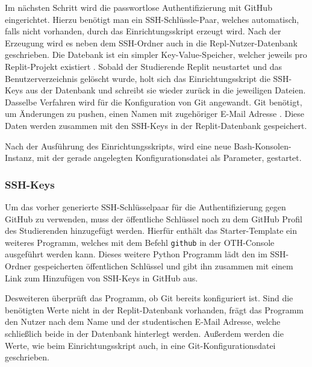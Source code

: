 Im nächsten Schritt wird die passwortlose Authentifizierung mit GitHub
eingerichtet. Hierzu benötigt man ein SSH-Schlüssle-Paar, welches automatisch,
falls nicht vorhanden, durch das Einrichtungsskript erzeugt wird. Nach der
Erzeugung wird es neben dem SSH-Ordner auch in die Repl-Nutzer-Datenbank
geschrieben. Die Datebank ist ein simpler Key-Value-Speicher, welcher jeweils
pro Replit-Projekt existiert \cite{replit-database}. Sobald der Studierende
Replit neustartet und das Benutzerverzeichnis gelöscht wurde, holt sich das Einrichtungsskript die SSH-Keys aus der Datenbank und schreibt sie wieder
zurück in die jeweiligen Dateien. Dasselbe Verfahren wird für die Konfiguration
von Git angewandt. Git benötigt, um Änderungen zu pushen, einen Namen mit
zugehöriger E-Mail Adresse \cite{git-config}. Diese Daten werden zusammen mit
den SSH-Keys in der Replit-Datenbank gespeichert.

Nach der Ausführung des Einrichtungsskripts, wird eine neue
Bash-Konsolen-Instanz, mit der gerade angelegten Konfigurationsdatei als
Parameter, gestartet.

\subsubsection{SSH-Keys}
Um das vorher generierte SSH-Schlüsselpaar für die Authentifizierung gegen
GitHub zu verwenden, muss der öffentliche Schlüssel noch zu dem GitHub Profil
des Studierenden hinzugefügt werden. Hierfür enthält das Starter-Template ein
weiteres Programm, welches mit dem Befehl \texttt{github} in der OTH-Console
ausgeführt werden kann. Dieses weitere Python Programm lädt den im SSH-Ordner
gespeicherten öffentlichen Schlüssel und gibt ihn zusammen mit einem Link
zum Hinzufügen von SSH-Keys in GitHub aus.

Desweiteren überprüft das Programm, ob Git bereits konfiguriert ist.
Sind die benötigten Werte nicht in der Replit-Datenbank vorhanden, frägt das
Programm den Nutzer nach dem Name und der studentischen E-Mail Adresse, welche schließlich beide in der Datenbank hinterlegt werden. Außerdem werden die Werte,
wie beim Einrichtungsskript auch, in eine Git-Konfigurationsdatei geschrieben.